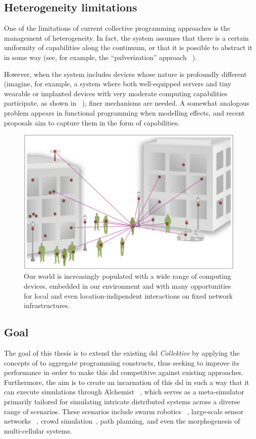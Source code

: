 \subsection{Heterogeneity limitations}
\label{subsec:heterogeneity-limitations}

One of the limitations of current collective programming approaches is the management of heterogeneity.
In fact, the system assumes that there is a certain uniformity of capabilities along the continuum, or that it is possible
to abstract it in some way (see, for example, the ``pulverization'' approach ~\cite{fi12110203}).

However, when the system includes devices whose nature is profoundly different (imagine, for example, a system where both
well-equipped servers and tiny wearable or implanted devices with very moderate computing capabilities participate, as
shown in ~), finer mechanisms are needed.
A somewhat analogous problem appears in functional programming when modelling effects, and recent proposals aim to capture
them in the form of capabilities.

\begin{figure} %
    \centering
    \includegraphics[width=.8\linewidth]{figures/smart-network-objects}
    \caption{Our world is increasingly populated with a wide range of computing devices, embedded in our environment
    and with many opportunities for local and even location-indipendent interactions on fixed network infrastructures.}
    \label{fig:smart-network-objects}
\end{figure}

\subsection{Goal}
\label{subsec:goal}
The goal of this thesis is to extend the existing \ac{dsl} \emph{Collektive} by applying the concepts of \xc{} to
aggregate programming constructs, thus seeking to improve its performance in order to make this \ac{dsl} competitive
against existing approaches.
Furthermore, the aim is to create an incarnation of this \ac{dsl} in such a way that it can execute simulations through
Alchemist ~\cite{10.1007/978-3-030-78198-9_10}, which serves as a meta-simulator primarily tailored for simulating
intricate distributed systems across a diverse range of scenarios.
These scenarios include swarm robotics ~\cite{aguzzi2024macroswarm}, large-scale sensor networks ~\cite{9927406}, crowd
simulation~\cite{7274429}, path planning, and even the morphogenesis of multi-cellular systems.

